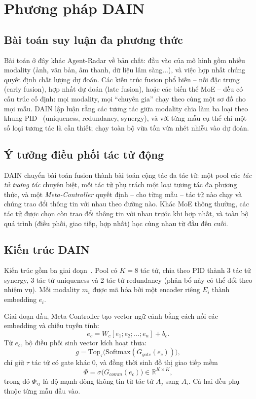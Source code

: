 \section{Phương pháp DAIN}\label{sec:dain}

\subsection{Bài toán suy luận đa phương thức}
Bài toán ở đây khác Agent-Radar về bản chất: đầu vào của mô hình gồm nhiều modality (ảnh, văn bản, âm thanh, dữ liệu lâm sàng...), và việc hợp nhất chúng quyết định chất lượng dự đoán. Các kiến trúc fusion phổ biến -- nối đặc trưng (early fusion), hợp nhất dự đoán (late fusion), hoặc các biến thể MoE -- đều có cấu trúc cố định: mọi modality, mọi ``chuyên gia'' chạy theo cùng một sơ đồ cho mọi mẫu. DAIN lập luận rằng các tương tác giữa modality chia làm ba loại theo khung PID~\cite{liang2023pid} (uniqueness, redundancy, synergy), và với từng mẫu cụ thể chỉ một số loại tương tác là cần thiết; chạy toàn bộ vừa tốn vừa nhét nhiễu vào dự đoán.

\subsection{Ý tưởng điều phối tác tử động}
DAIN chuyển bài toán fusion thành bài toán cộng tác đa tác tử: một pool các \emph{tác tử tương tác} chuyên biệt, mỗi tác tử phụ trách một loại tương tác đa phương thức, và một \emph{Meta-Controller} quyết định -- cho từng mẫu -- tác tử nào chạy và chúng trao đổi thông tin với nhau theo đường nào. Khác MoE thông thường, các tác tử được chọn còn trao đổi thông tin với nhau trước khi hợp nhất, và toàn bộ quá trình (điều phối, giao tiếp, hợp nhất) học cùng nhau từ đầu đến cuối.

\subsection{Kiến trúc DAIN}
Kiến trúc gồm ba giai đoạn~\cite{dain2026}. Pool có $K = 8$ tác tử, chia theo PID thành 3 tác tử synergy, 3 tác tử uniqueness và 2 tác tử redundancy (phân bổ này có thể đổi theo nhiệm vụ). Mỗi modality $m_i$ được mã hóa bởi một encoder riêng $E_i$ thành embedding $e_i$.

Giai đoạn đầu, Meta-Controller tạo vector ngữ cảnh bằng cách nối các embedding và chiếu tuyến tính:
\begin{equation}
e_c = W_c[e_1; e_2; \dots; e_n] + b_c.
\label{eq:dain-ctx}
\end{equation}
Từ $e_c$, bộ điều phối sinh vector kích hoạt thưa:
\begin{equation}
g = \mathrm{Top}_\tau\big(\mathrm{Softmax}(G_{gate}(e_c))\big),
\label{eq:dain-gate}
\end{equation}
chỉ giữ $\tau$ tác tử có gate khác 0, và đồng thời sinh đồ thị giao tiếp mềm
\begin{equation}
\Phi = \sigma\big(G_{comm}(e_c)\big) \in \mathbb{R}^{K\times K},
\label{eq:dain-comm}
\end{equation}
trong đó $\Phi_{ij}$ là độ mạnh dòng thông tin từ tác tử $A_j$ sang $A_i$. Cả hai đều phụ thuộc từng mẫu đầu vào.

